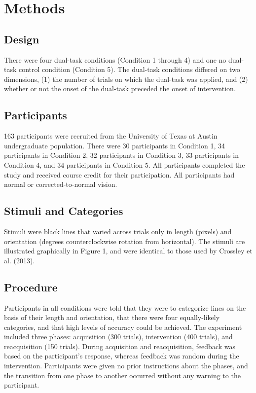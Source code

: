 \section*{Methods}
\subsection*{Design}
There were four dual-task conditions (Condition 1 through 4) and one no
dual-task control condition (Condition 5). The dual-task conditions differed on
two dimensions, (1) the number of trials on which the dual-task was applied, and
(2) whether or not the onset of the dual-task preceded the onset of
intervention.

\subsection*{Participants}
163 participants were recruited from the University of Texas at Austin
undergraduate population. There were 30 participants in Condition 1, 34
participants in Condition 2, 32 participants in Condition 3, 33 participants in
Condition 4, and 34 participants in Condition 5. All participants completed the
study and received course credit for their participation. All participants had
normal or corrected-to-normal vision.

\subsection*{Stimuli and Categories}
Stimuli were black lines that varied across trials only in length (pixels) and
orientation (degrees counterclockwise rotation from horizontal). The stimuli are
illustrated graphically in Figure 1, and were identical to those used by
Crossley et al. (2013).

\subsection{Procedure}
Participants in all conditions were told that they were to categorize lines on
the basis of their length and orientation, that there were four equally-likely
categories, and that high levels of accuracy could be achieved. The experiment
included three phases: acquisition (300 trials), intervention (400 trials), and
reacquisition (150 trials). During acquisition and reacquisition, feedback was
based on the participant's response, whereas feedback was random during the
intervention. Participants were given no prior instructions about the phases,
and the transition from one phase to another occurred without any warning to the
participant.

